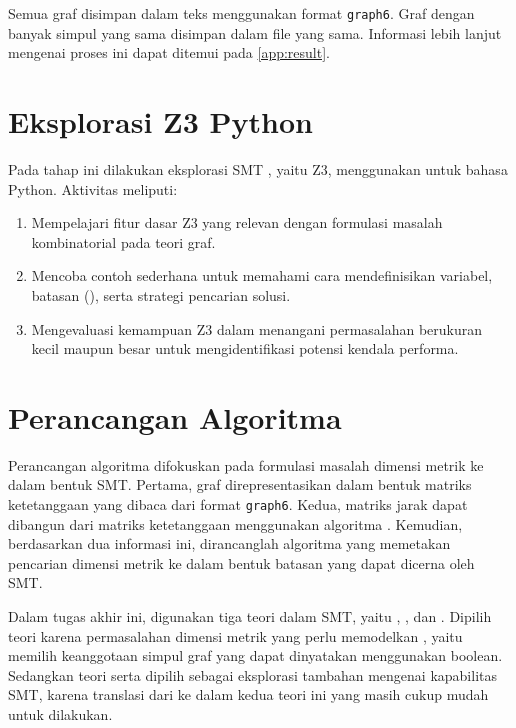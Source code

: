 Semua graf disimpan dalam  teks menggunakan format \verb`graph6`. Graf dengan banyak simpul yang sama disimpan dalam file yang sama. Informasi lebih lanjut mengenai proses ini dapat ditemui pada \cref{app:result}.

\section{Eksplorasi Z3 Python}

Pada tahap ini dilakukan eksplorasi SMT , yaitu Z3, menggunakan  untuk bahasa Python. Aktivitas meliputi:

\begin{enumerate}

	\item Mempelajari fitur dasar Z3 yang relevan dengan formulasi masalah kombinatorial pada teori graf.

	\item Mencoba contoh sederhana untuk memahami cara mendefinisikan variabel, batasan (), serta strategi pencarian solusi.

	\item Mengevaluasi kemampuan Z3 dalam menangani permasalahan berukuran kecil maupun besar untuk mengidentifikasi potensi kendala performa.

\end{enumerate}

\section{Perancangan Algoritma}

Perancangan algoritma difokuskan pada formulasi masalah dimensi metrik ke dalam bentuk SMT. Pertama, graf direpresentasikan dalam bentuk matriks ketetanggaan yang dibaca dari format \verb`graph6`. Kedua, matriks jarak dapat dibangun dari matriks ketetanggaan menggunakan algoritma . Kemudian, berdasarkan dua informasi ini, dirancanglah algoritma yang memetakan pencarian dimensi metrik ke dalam bentuk batasan yang dapat dicerna oleh SMT.

Dalam tugas akhir ini, digunakan tiga teori dalam SMT, yaitu , , dan . Dipilih teori  karena permasalahan dimensi metrik yang perlu memodelkan , yaitu memilih keanggotaan simpul graf yang dapat dinyatakan menggunakan  boolean. Sedangkan teori  serta  dipilih sebagai eksplorasi tambahan mengenai kapabilitas SMT, karena translasi  dari  ke dalam kedua teori ini yang masih cukup mudah untuk dilakukan.

